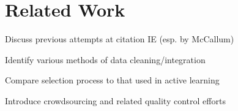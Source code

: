 \section{Related Work}

Discuss previous attempts at citation IE (esp. by McCallum) \newline

\noindent Identify various methods of data cleaning/integration \newline

\noindent Compare selection process to that used in active learning \newline

\noindent Introduce crowdsourcing and related quality control efforts
